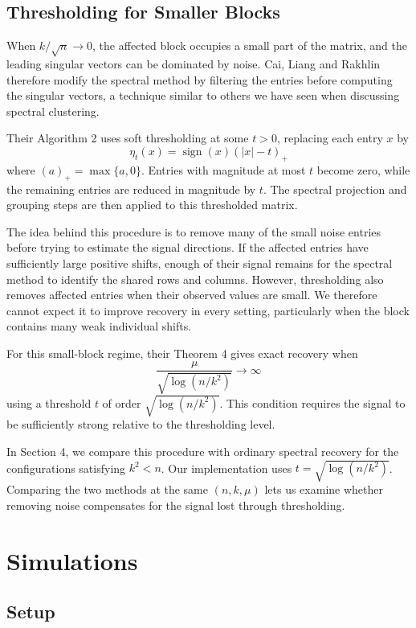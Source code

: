 \documentclass[12pt]{article}
\begin{document}
\subsection{Thresholding for Smaller Blocks}

When $k/\sqrt n\to0$, the affected block occupies a small part of the
matrix, and the leading singular vectors can be dominated by noise.
Cai, Liang and Rakhlin~\cite{CLR2017} therefore modify the spectral
method by filtering the entries before computing the singular vectors, a technique similar to others we have seen when discussing spectral clustering.

Their Algorithm 2 uses soft thresholding at some $t>0$, replacing
each entry $x$ by
\[
\eta_t(x)=\operatorname{sign}(x)(|x|-t)_+
\]
where $(a)_+=\max\{a,0\}$. Entries with magnitude at most $t$ become
zero, while the remaining entries are reduced in magnitude by $t$.
The spectral projection and grouping steps are then applied to this
thresholded matrix.

The idea behind this procedure is to remove many of the small noise entries before trying
to estimate the signal directions. If the affected entries have
sufficiently large positive shifts, enough of their signal remains
for the spectral method to identify the shared rows and columns.
However, thresholding also removes affected entries when their
observed values are small. We therefore cannot expect it to improve
recovery in every setting, particularly when the block contains many
weak individual shifts.

For this small-block regime, their Theorem 4 gives exact recovery when
\[
\frac{\mu}{\sqrt{\log(n/k^2)}}\longrightarrow\infty
\]
using a threshold $t$ of order $\sqrt{\log(n/k^2)}$. This condition
requires the signal to be sufficiently strong relative to the
thresholding level.

In Section 4, we compare this procedure with ordinary spectral
recovery for the configurations satisfying $k^2<n$. Our implementation
uses $t=\sqrt{\log(n/k^2)}$. Comparing the two methods at the same
$(n,k,\mu)$ lets us examine whether removing noise compensates for
the signal lost through thresholding.

\label{end:main}
\section{Simulations}\label{sec:simulations}

\subsection{Setup}
\end{document}
